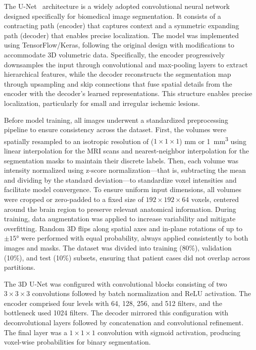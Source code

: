 \documentclass[12pt]{article}
\begin{document}
The U-Net~\cite{ronnebergerUNetConvolutionalNetworks2015} architecture is a widely adopted convolutional neural network designed specifically for biomedical image segmentation. It consists of a contracting path (encoder) that captures context and a symmetric expanding path (decoder) that enables precise localization. The model was implemented using TensorFlow/Keras, following the original design with modifications to accommodate 3D volumetric data. Specifically, the encoder progressively downsamples the input through convolutional and max-pooling layers to extract hierarchical features, while the decoder reconstructs the segmentation map through upsampling and skip connections that fuse spatial details from the encoder with the decoder’s learned representations. This structure enables precise localization, particularly for small and irregular ischemic lesions.

Before model training, all images underwent a standardized preprocessing pipeline to ensure consistency across the dataset. First, the volumes were spatially resampled to an isotropic resolution of ($1 \times 1 \times 1 $) mm or \SI{1}{\milli\meter\cubed} using linear interpolation for the MRI scans and nearest-neighbor interpolation for the segmentation masks to maintain their discrete labels. Then, each volume was intensity normalized using z-score normalization---that is, subtracting the mean and dividing by the standard deviation---to standardize voxel intensities and facilitate model convergence. To ensure uniform input dimensions, all volumes were cropped or zero-padded to a fixed size of $192 \times 192 \times 64$ voxels, centered around the brain region to preserve relevant anatomical information.
%
During training, data augmentation was applied to increase variability and mitigate overfitting. Random 3D flips along spatial axes and in-plane rotations of up to $\pm15$° were performed with equal probability, always applied consistently to both images and masks. The dataset was divided into training (80\%), validation (10\%), and test (10\%) subsets, ensuring that patient cases did not overlap across partitions.

The 3D U-Net was configured with convolutional blocks consisting of two $3 \times 3 \times 3$ convolutions followed by batch normalization and ReLU activation. The encoder comprised four levels with 64, 128, 256, and 512 filters, and the bottleneck used 1024 filters. The decoder mirrored this configuration with deconvolutional layers followed by concatenation and convolutional refinement. The final layer was a  $1 \times 1 \times 1 $ convolution with sigmoid activation, producing voxel-wise probabilities for binary segmentation.
\end{document}
